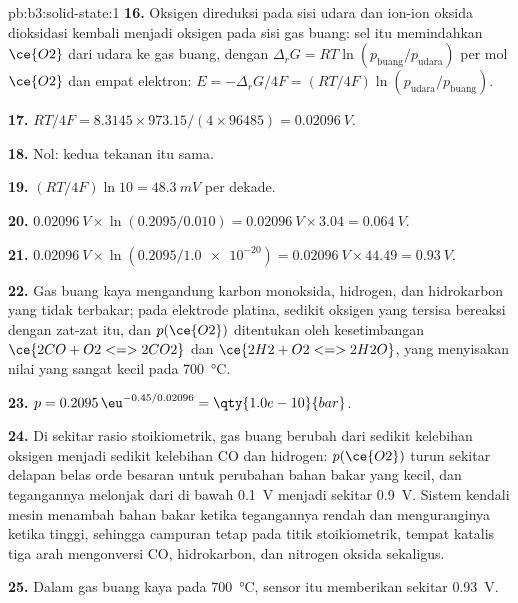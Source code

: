 \begin{solution}{pb:b3:solid-state:1}
\textbf{16.} Oksigen direduksi pada sisi udara dan ion-ion oksida dioksidasi kembali
menjadi oksigen pada sisi gas buang: sel itu memindahkan $\ce{O2}$ dari udara ke gas buang, dengan
$\Delta_rG = RT\ln(p_{\mathrm{buang}}/p_{\mathrm{udara}})$ per mol $\ce{O2}$ dan empat elektron: $E = -\Delta_rG/4F = (RT/4F)\ln(p_{\mathrm{udara}}/p_{\mathrm{buang}})$.

\textbf{17.} $RT/4F = 8.3145 \times 973.15/(4 \times 96485) = \qty{0.02096}{V}$.

\textbf{18.} Nol: kedua tekanan itu sama.

\textbf{19.} $(RT/4F)\ln 10 = \qty{48.3}{mV}$ per dekade.

\textbf{20.} $\qty{0.02096}{V} \times \ln(0.2095/0.010) = \qty{0.02096}{V} \times 3.04 = \qty{0.064}{V}$.

\textbf{21.} $\qty{0.02096}{V} \times \ln(0.2095/\num{1.0e-20}) = \qty{0.02096}{V} \times 44.49 = \qty{0.93}{V}$.

\textbf{22.} Gas buang kaya mengandung karbon monoksida, hidrogen, dan hidrokarbon
yang tidak terbakar; pada elektrode platina, sedikit oksigen yang tersisa bereaksi dengan zat-zat itu,
dan $p(\ce{O2})$ ditentukan oleh kesetimbangan $\ce{2CO + O2 <=> 2CO2}$ dan $\ce{2H2 + O2 <=> 2H2O}$, yang menyisakan nilai yang
sangat kecil pada \qty{700}{\celsius}.

\textbf{23.} $p = 0.2095\,\eu^{-0.45/0.02096} = \qty{1.0e-10}{bar}$.

\textbf{24.} Di sekitar rasio stoikiometrik, gas buang berubah dari sedikit kelebihan
oksigen menjadi sedikit kelebihan CO dan hidrogen: $p(\ce{O2})$ turun sekitar delapan belas
orde besaran untuk perubahan bahan bakar yang kecil, dan tegangannya melonjak dari di bawah
\qty{0.1}{V} menjadi sekitar \qty{0.9}{V}. Sistem kendali mesin menambah bahan bakar ketika tegangannya rendah dan
menguranginya ketika tinggi, sehingga campuran tetap pada titik stoikiometrik, tempat
katalis tiga arah mengonversi CO, hidrokarbon, dan nitrogen oksida sekaligus.

\textbf{25.} Dalam gas buang kaya pada \qty{700}{\celsius}, sensor itu memberikan sekitar \qty{0.93}{V}.
\end{solution}
